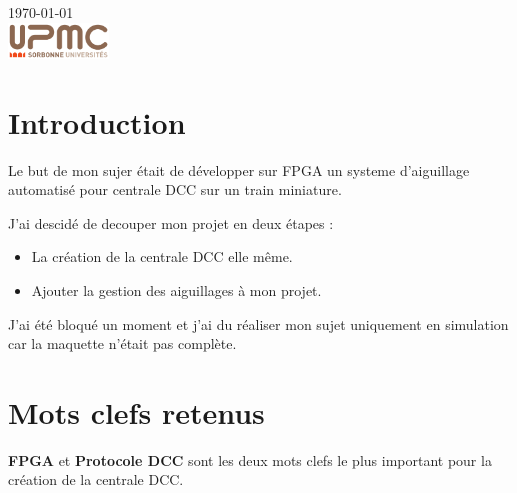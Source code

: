 \begin{titlepage}
{\large \today}\\[2cm] %


\includegraphics[width=0.2\textwidth]{logo.png}


\vfill %

\end{titlepage}




\section{Introduction}
\label{sec:introduction}

Le but de mon sujer était de développer sur FPGA un systeme
d'aiguillage automatisé pour centrale DCC sur un train miniature.

J'ai descidé de decouper mon projet en deux étapes :
\begin{itemize}
  \item La création de la centrale DCC elle même.
  \item Ajouter la gestion des aiguillages à mon projet.
\end{itemize}  

J'ai été bloqué un moment et j'ai du réaliser mon sujet uniquement en
simulation car la maquette n'était pas complète.

\section{Mots clefs retenus}
\label{sec:Mots_clefs}

\textbf{FPGA} et \textbf{Protocole DCC} sont les deux mots clefs le plus important pour
la création de la centrale DCC.

